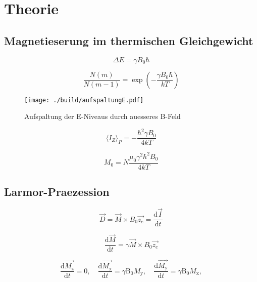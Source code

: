 \section{Theorie}%
\label{sec:theorie}

\subsection{Magnetieserung im thermischen Gleichgewicht}%
\label{ssub:magnetieserung_im_thermischen_gleichgewicht}

\begin{equation}
		\label{eq:delta_e}
		\Delta E = \gamma B_0 \hbar 
\end{equation}

\begin{equation}
		\label{eq:boltzmann}
		\frac{N(m)}{N(m-1)} = \exp \left( - \frac{\gamma B_0 \hbar}{kT} \right)
\end{equation}

\begin{figure}[ht]
		\centering
		\texttt{[image: ./build/aufspaltungE.pdf]}
		\caption{Aufspaltung der E-Niveaus durch auesseres B-Feld}
		\label{fig:aufsp_E}
\end{figure}

\begin{equation}
		\label{eq:kernpo}
		\langle I_Z \rangle_P = - \frac{\hbar^2 \gamma B_0}{4 kT}
\end{equation}

\begin{equation}
		\label{eq:magn}
		M_0 = N \frac{\mu_0 \gamma^2 \hbar^2 B_0}{4 kT}
\end{equation}

\subsection{Larmor-Praezession}%
\label{sub:larmor_praezession}

\begin{equation}
		\label{eq:dreh}
		\vec{D} = \vec{M} \times B_0 \vec{z_e} = \frac{\text{d} \vec{I}}{\text{d}t} 
\end{equation}

\begin{equation}
		\label{eq:dreh}
		\frac{\text{d} \vec{M}}{\text{d}t} = \gamma \vec{M} \times B_0 \vec{z_e}
\end{equation}

\begin{equation}
		\label{eq:ablM}
		\frac{\text{d} \vec{M_\text{z}}}{\text{d}t} = 0 ,  \hspace{1em}
		\frac{\text{d} \vec{M_\text{x}}}{\text{d}t} = \gamma \text{B}_0
		M_\text{y}, \hspace{1em}
		\frac{\text{d} \vec{M_\text{y}}}{\text{d}t} = \gamma \text{B}_0
		M_\text{x}, 
\end{equation}

